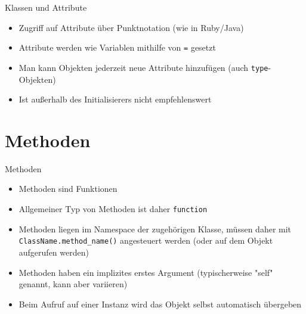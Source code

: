 \begin{frame}[fragile]{Klassen und Attribute}
	\begin{itemize}
		\item Zugriff auf Attribute über Punktnotation (wie in Ruby/Java)
		\item Attribute werden wie Variablen mithilfe von \texttt{=} gesetzt
		\item Man kann Objekten jederzeit neue Attribute hinzufügen (auch \texttt{type}-Objekten)
		\item Ist außerhalb des Initialisierers nicht empfehlenswert
	\end{itemize}
\end{frame}


\section{Methoden}
\begin{frame}[fragile]{Methoden}
	\begin{itemize}
		\item Methoden sind Funktionen
		\item Allgemeiner Typ von Methoden ist daher \texttt{function}
		\item Methoden liegen im Namespace der zugehörigen Klasse, müssen daher mit \texttt{ClassName.method\_name()} angesteuert werden (oder auf dem Objekt aufgerufen werden)
		\item Methoden haben ein implizites erstes Argument (typischerweise "self" genannt, kann aber variieren)
		\item Beim Aufruf auf einer Instanz wird das Objekt selbst automatisch übergeben
	\end{itemize}
\end{frame}


